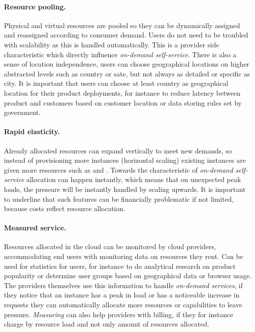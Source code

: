 \paragraph{Resource pooling.}

Physical and virtual resources are pooled so they can be 
dynamically assigned and reassigned according to consumer demand.
Users do not need to be troubled with scalability as this is handled automatically.
This is a provider side characteristic which directly influence \emph{on-demand self-service}.
There is also a sense of location independence, users can choose geographical locations
on higher abstracted levels such as country or sate, but not always as detailed or specific as city.
It is important that users can choose at least country as geographical location
for their product deployments, 
for instance to reduce latency between product and customers
based on customer location or data storing rules set by government.

\paragraph{Rapid elasticity.}

Already allocated resources can expand vertically to meet new demands,
so instead of provisioning more instances (horizontal scaling) existing
instances are given more resources such as  and .
Towards the characteristic of \emph{on-demand self-service} allocation
can happen instantly, which means that on unexpected peak loads,
the pressure will be instantly handled by scaling upwards.
It is important to underline that such features can be financially problematic if not limited,
because costs reflect resource allocation.

\paragraph{Measured service.}

Resources allocated in the cloud can be monitored by cloud providers,
accommodating end users with monitoring data on resources they rent.
Can be used for statistics for users, for instance to do analytical research on product popularity
or determine user groups based on geographical data or browser usage.
The providers themselves use this information to handle \emph{on-demand services},
if they notice that an instance has a peak in load or has a noticeable increase 
in requests they can automatically allocate more resources or capabilities 
to leave pressure.
\emph{Measuring} can also help providers with billing, if they for instance
charge by resource load and not only amount of resources allocated.

